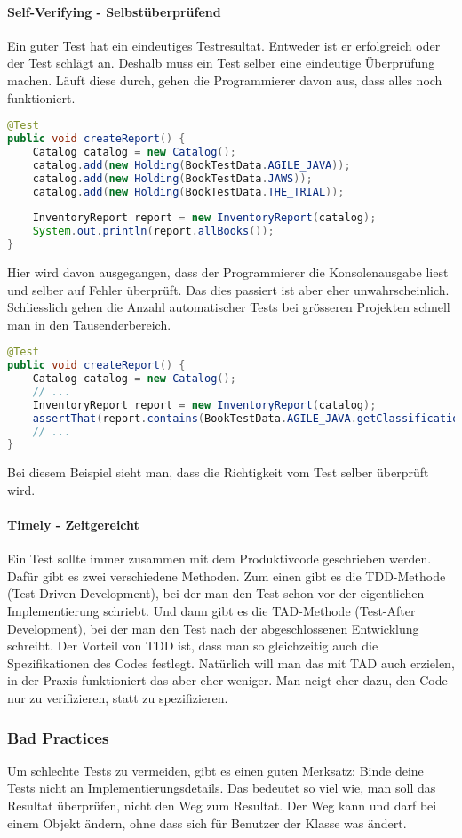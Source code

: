 \paragraph{Self-Verifying - Selbstüberprüfend}
Ein guter Test hat ein eindeutiges Testresultat. Entweder ist er erfolgreich oder der Test schlägt an. Deshalb muss ein Test selber eine eindeutige Überprüfung machen. Läuft diese durch, gehen die Programmierer davon aus, dass alles noch funktioniert. 
\begin{lstlisting}[language=Java, caption={Schlechtes Beispiel}]
@Test
public void createReport() {
	Catalog catalog = new Catalog();
	catalog.add(new Holding(BookTestData.AGILE_JAVA));
	catalog.add(new Holding(BookTestData.JAWS));
	catalog.add(new Holding(BookTestData.THE_TRIAL));
 	
	InventoryReport report = new InventoryReport(catalog);
	System.out.println(report.allBooks());
}
\end{lstlisting}
Hier wird davon ausgegangen, dass der Programmierer die Konsolenausgabe liest und selber auf Fehler überprüft. Das dies passiert ist aber eher unwahrscheinlich. Schliesslich gehen die Anzahl automatischer Tests bei grösseren Projekten schnell man in den Tausenderbereich.
\begin{lstlisting}[language=Java, caption={Gutes Beispiel}]
@Test
public void createReport() {
	Catalog catalog = new Catalog();
	// ...
	InventoryReport report = new InventoryReport(catalog);
	assertThat(report.contains(BookTestData.AGILE_JAVA.getClassification());
	// ...
}
\end{lstlisting}
Bei diesem Beispiel sieht man, dass die Richtigkeit vom Test selber überprüft wird.
\paragraph{Timely - Zeitgereicht}
Ein Test sollte immer zusammen mit dem Produktivcode geschrieben werden. Dafür gibt es zwei verschiedene Methoden. Zum einen gibt es die TDD-Methode (Test-Driven Development), bei der man den Test schon vor der eigentlichen Implementierung schriebt. Und dann gibt es die TAD-Methode (Test-After Development), bei der man den Test nach der abgeschlossenen Entwicklung schreibt. Der Vorteil von TDD ist, dass man so gleichzeitig auch die Spezifikationen des Codes festlegt. Natürlich will man das mit TAD auch erzielen, in der Praxis funktioniert das aber eher weniger. Man neigt eher dazu, den Code nur zu verifizieren, statt zu spezifizieren. 
\subsubsection{Bad Practices}
Um schlechte Tests zu vermeiden, gibt es einen guten Merksatz: Binde deine Tests nicht an Implementierungsdetails. Das bedeutet so viel wie, man soll das Resultat überprüfen, nicht den Weg zum Resultat. Der Weg kann und darf bei einem Objekt ändern, ohne dass sich für Benutzer der Klasse was ändert.
